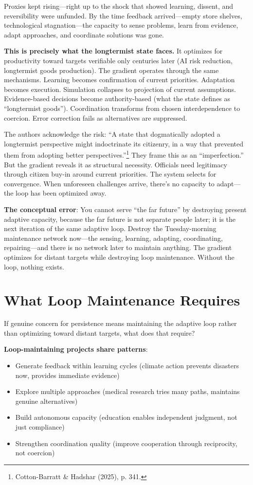 \documentclass[12pt,a4paper]{article}
\begin{document}
Proxies kept rising---right up to the shock that showed learning, dissent, and reversibility were unfunded. By the time feedback arrived---empty store shelves, technological stagnation---the capacity to sense problems, learn from evidence, adapt approaches, and coordinate solutions was gone.

\textbf{This is precisely what the longtermist state faces.} It optimizes for productivity toward targets verifiable only centuries later (AI risk reduction, longtermist goods production). The gradient operates through the same mechanisms. Learning becomes confirmation of current priorities. Adaptation becomes execution. Simulation collapses to projection of current assumptions. Evidence-based decisions become authority-based (what the state defines as ``longtermist goods''). Coordination transforms from chosen interdependence to coercion. Error correction fails as alternatives are suppressed.

The authors acknowledge the risk: ``A state that dogmatically adopted a longtermist perspective might indoctrinate its citizenry, in a way that prevented them from adopting better perspectives.''\footnote{Cotton-Barratt \& Hadshar (2025), p. 341.} They frame this as an ``imperfection.'' But the gradient reveals it as structural necessity. Officials need legitimacy through citizen buy-in around current priorities. The system selects for convergence. When unforeseen challenges arrive, there's no capacity to adapt---the loop has been optimized away.

\textbf{The conceptual error}: You cannot serve ``the far future'' by destroying present adaptive capacity, because the far future is not separate people later; it is the next iteration of the same adaptive loop. Destroy the Tuesday-morning maintenance network now---the sensing, learning, adapting, coordinating, repairing---and there is no network later to maintain anything. The gradient optimizes for distant targets while destroying loop maintenance. Without the loop, nothing exists.

\section{What Loop Maintenance Requires}

If genuine concern for persistence means maintaining the adaptive loop rather than optimizing toward distant targets, what does that require?

\textbf{Loop-maintaining projects share patterns}:
\begin{itemize}
\item Generate feedback within learning cycles (climate action prevents disasters now, provides immediate evidence)
\item Explore multiple approaches (medical research tries many paths, maintains genuine alternatives)
\item Build autonomous capacity (education enables independent judgment, not just compliance)
\item Strengthen coordination quality (improve cooperation through reciprocity, not coercion)
\end{itemize}
\end{document}
